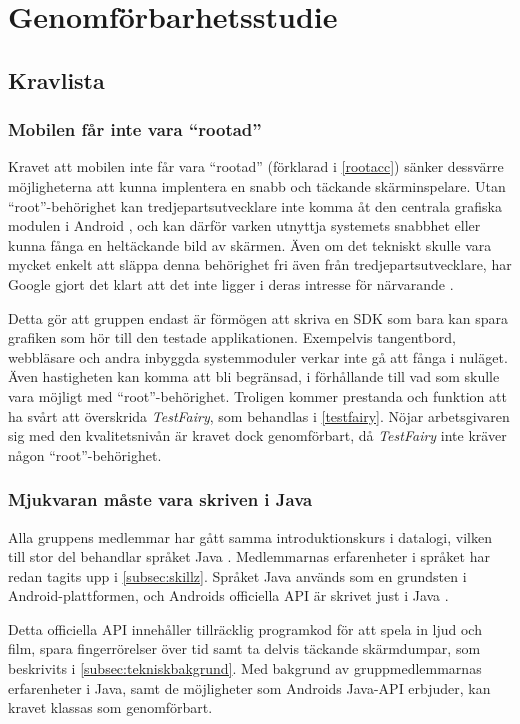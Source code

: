 \section{Genomförbarhetsstudie}
\subsection{Kravlista}
\subsubsection{Mobilen får inte vara ``rootad''}
Kravet att mobilen inte får vara ``rootad'' (förklarad i \ref{rootacc}) sänker dessvärre möjligheterna att kunna implentera en snabb och täckande skärminspelare. Utan ``root''-behörighet kan tredjepartsutvecklare inte komma åt den centrala grafiska modulen i Android \parencite{adoc}, och kan därför varken utnyttja systemets snabbhet eller kunna fånga en heltäckande bild av skärmen. Även om det tekniskt skulle vara mycket enkelt att släppa denna behörighet fri även från tredjepartsutvecklare, har Google gjort det klart att det inte ligger i deras intresse för närvarande \parencite{uhno}.

Detta gör att gruppen endast är förmögen att skriva en SDK som bara kan spara grafiken som hör till den testade applikationen. Exempelvis tangentbord, webbläsare och andra inbyggda systemmoduler verkar inte gå att fånga i nuläget. Även hastigheten kan komma att bli begränsad, i förhållande till vad som skulle vara möjligt med ``root''-behörighet. Troligen kommer prestanda och funktion att ha svårt att överskrida \textit{TestFairy}, som behandlas i \ref{testfairy}. Nöjar arbetsgivaren sig med den kvalitetsnivån är kravet dock genomförbart, då \textit{TestFairy} inte kräver någon ``root''-behörighet.

\subsubsection{Mjukvaran måste vara skriven i Java}
Alla gruppens medlemmar har gått samma introduktionskurs i datalogi, vilken till stor del behandlar språket Java \parencite{inda}. Medlemmarnas erfarenheter i språket har redan tagits upp i \ref{subsec:skillz}. Språket Java används som en grundsten i Android-plattformen, och Androids officiella API är skrivet just i Java \parencite{adoc}. 

Detta officiella API innehåller tillräcklig programkod för att spela in ljud och film, spara fingerrörelser över tid samt ta delvis täckande skärmdumpar, som beskrivits i \ref{subsec:tekniskbakgrund}. Med bakgrund av gruppmedlemmarnas erfarenheter i Java, samt de möjligheter som Androids Java-API erbjuder, kan kravet klassas som genomförbart.

